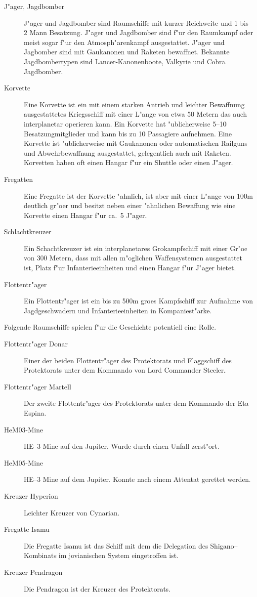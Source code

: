 \begin{appendices}
\begin{description}
\item [J"ager, Jagdbomber] J"ager und Jagdbomber sind Raumschiffe mit kurzer Reichweite und 1 bis 2 Mann Besatzung.
      J"ager und Jagdbomber sind f"ur den Raumkampf oder meist sogar f"ur den Atmosph"arenkampf ausgestattet. J"ager und Jagbomber sind mit Gau\3kanonen und Raketen bewaffnet. Bekannte Jagdbombertypen sind Lancer-Kanonenboote, Valkyrie  und Cobra Jagdbomber.
\item [Korvette] Eine Korvette ist ein mit einem starken Antrieb und leichter Bewaffnung ausgestattetes Kriegsschiff
      mit einer L"ange von etwa 50 Metern das auch interplanetar operieren kann. Ein Korvette hat "ublicherweise 5--10 Besatzungmitglieder und kann bis zu 10 Passagiere aufnehmen. Eine Korvette ist "ublicherweise mit Gau\3kanonen oder automatischen Railguns und Abwehrbewaffnung ausgestattet, gelegentlich auch mit Raketen. Korvetten haben oft einen Hangar f"ur ein Shuttle oder einen J"ager.
\item [Fregatten] Eine Fregatte ist der Korvette "ahnlich, ist aber mit einer L"ange von 100m deutlich gr"o\3er und besitzt
      neben einer "ahnlichen Bewaffung wie eine Korvette einen Hangar f"ur ca.~5 J"ager.
\item [Schlachtkreuzer] Ein Schachtkreuzer ist ein interplanetares Gro\3kampfschiff mit einer Gr"o\3e von 300 Metern,
      dass mit allen m"oglichen Waffensystemen ausgestattet ist, Platz f"ur Infanterieeinheiten und einen Hangar f"ur J"ager bietet.
\item [Flottentr"ager] Ein Flottentr"ager ist ein bis zu 500m gro\3es Kampfschiff zur Aufnahme von
      Jagdgeschwadern und Infanterieeinheiten in Kompaniest"arke.
\end{description}

Folgende Raumschiffe spielen f"ur die Geschichte potentiell eine Rolle.

\begin{description}
\item [Flottentr"ager Donar] Einer der beiden Flottentr"ager des Protektorats und Flaggschiff des Protektorats unter
       dem Kommando von Lord Commander Steeler.
\item [Flottentr"ager Martell] Der zweite Flottentr"ager des Protektorats unter dem Kommando der Eta Espina.
\item [HeM03-Mine] HE--3 Mine auf den Jupiter. Wurde durch einen Unfall zerst"ort.
\item [HeM05-Mine] HE--3 Mine auf dem Jupiter. Konnte nach einem Attentat gerettet werden.
\item [Kreuzer Hyperion] Leichter Kreuzer von Cynarian.
\item [Fregatte Isamu] Die Fregatte Isamu ist das Schiff mit dem die Delegation des Shigano--Kombinats im jovianischen
      System eingetroffen ist.
\item [Kreuzer Pendragon] Die Pendragon ist der Kreuzer des Protektorats.
\end{description}


\end{appendices}
